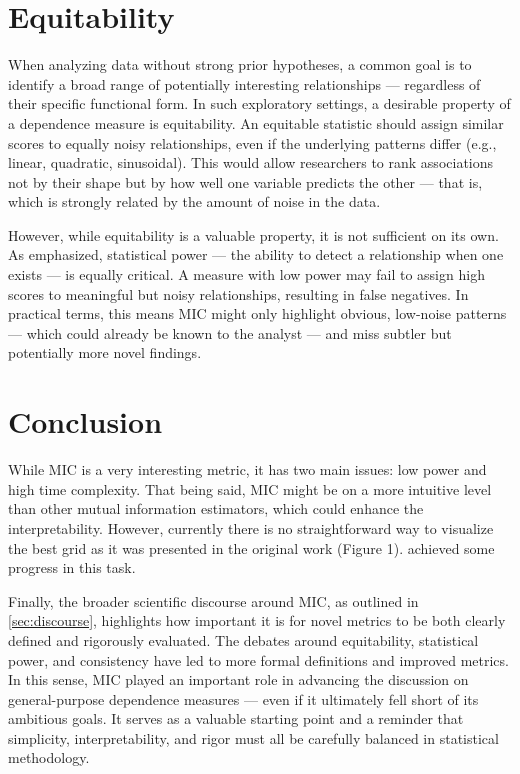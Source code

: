 \documentclass{article}
\begin{document}
\section{Equitability}
When analyzing data without strong prior hypotheses, a common goal is to identify a broad range of potentially interesting relationships — regardless of their specific functional form. In such exploratory settings, a desirable property of a dependence measure is equitability. An equitable statistic should assign similar scores to equally noisy relationships, even if the underlying patterns differ (e.g., linear, quadratic, sinusoidal). This would allow researchers to rank associations not by their shape but by how well one variable predicts the other — that is, which is strongly related by the amount of noise in the data.

However, while equitability is a valuable property, it is not sufficient on its own. As \cite{simon2014} emphasized, statistical power — the ability to detect a relationship when one exists — is equally critical. A measure with low power may fail to assign high scores to meaningful but noisy relationships, resulting in false negatives. In practical terms, this means MIC might only highlight obvious, low-noise patterns — which could already be known to the analyst — and miss subtler but potentially more novel findings.


\section{Conclusion}
While MIC is a very interesting metric, it has two main issues: low power and high time complexity. That being said, MIC might be on a more intuitive level than other mutual information estimators, which could enhance the interpretability. However, currently there is no straightforward way to visualize the best grid as it was presented in the original work \citep{reshef2011} (Figure 1). \cite{cao2021} achieved some progress in this task. 

Finally, the broader scientific discourse around MIC, as outlined in \autoref{sec:discourse}, highlights how important it is for novel metrics to be both clearly defined and rigorously evaluated. The debates around equitability, statistical power, and consistency have led to more formal definitions and improved metrics. In this sense, MIC played an important role in advancing the discussion on general-purpose dependence measures — even if it ultimately fell short of its ambitious goals. It serves as a valuable starting point and a reminder that simplicity, interpretability, and rigor must all be carefully balanced in statistical methodology.




	

\end{document}
